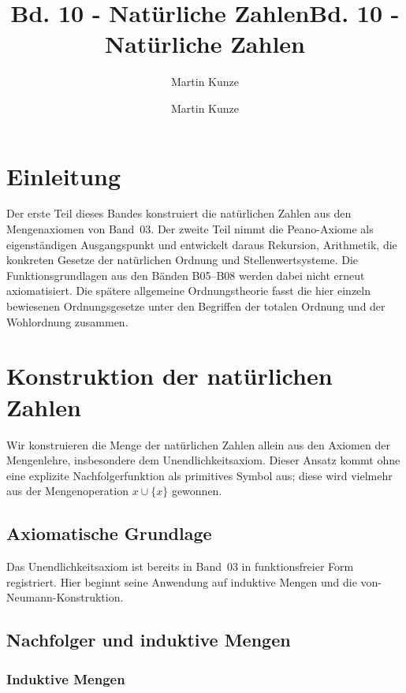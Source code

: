 \documentclass[main.tex]{subfiles}
\title{Bd. 10 - Natürliche Zahlen}
\author{Martin Kunze}
\date{}
\begin{document}
\title{Bd. 10 - Natürliche Zahlen}
\author{Martin Kunze}
\date{}
\hypersetup{pageanchor=false}
\maketitle
\hypersetup{pageanchor=true}
\setcounter{tocdepth}{3}
\tableofcontents
\setcounter{file}{10}
\renewcommand{\FormulaBandID}{10}

\chapter{Einleitung}

Der erste Teil dieses Bandes konstruiert die natürlichen Zahlen aus den
Mengenaxiomen von Band~03. Der zweite Teil nimmt die Peano-Axiome als
eigenständigen Ausgangspunkt und entwickelt daraus Rekursion, Arithmetik,
die konkreten Gesetze der natürlichen Ordnung und Stellenwertsysteme. Die
Funktionsgrundlagen aus den Bänden B05--B08 werden dabei nicht erneut
axiomatisiert. Die spätere allgemeine Ordnungstheorie fasst die hier einzeln
bewiesenen Ordnungsgesetze unter den Begriffen der totalen Ordnung und der
Wohlordnung zusammen.

\chapter{Konstruktion der natürlichen Zahlen}

Wir konstruieren die Menge der natürlichen Zahlen allein aus den Axiomen der Mengenlehre, insbesondere dem Unendlichkeitsaxiom.  Dieser Ansatz kommt ohne eine explizite Nachfolgerfunktion als primitives Symbol aus; diese wird vielmehr aus der Mengenoperation \(x \cup \{x\}\) gewonnen.


\section{Axiomatische Grundlage}

Das Unendlichkeitsaxiom ist bereits in Band~03 in funktionsfreier Form
registriert. Hier beginnt seine Anwendung auf induktive Mengen und die
von-Neumann-Konstruktion.

\section{Nachfolger und induktive Mengen}

\subsection{Induktive Mengen}
\end{document}
